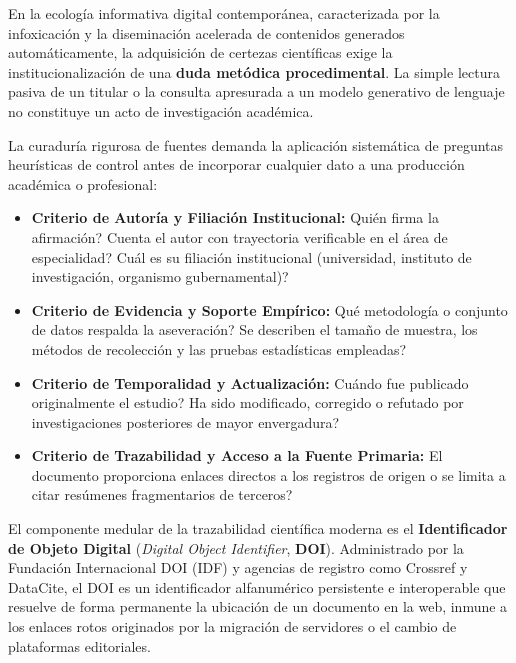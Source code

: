 En la ecología informativa digital contemporánea, caracterizada por la infoxicación y la diseminación acelerada de contenidos generados automáticamente, la adquisición de certezas científicas exige la institucionalización de una \textbf{duda metódica procedimental}. La simple lectura pasiva de un titular o la consulta apresurada a un modelo generativo de lenguaje no constituye un acto de investigación académica.

La curaduría rigurosa de fuentes demanda la aplicación sistemática de preguntas heurísticas de control antes de incorporar cualquier dato a una producción académica o profesional:
\begin{itemize}
    \item \textbf{Criterio de Autoría y Filiación Institucional:} \textquestiondown Quién firma la afirmación? \textquestiondown Cuenta el autor con trayectoria verificable en el área de especialidad? \textquestiondown Cuál es su filiación institucional (universidad, instituto de investigación, organismo gubernamental)?
    \item \textbf{Criterio de Evidencia y Soporte Empírico:} \textquestiondown Qué metodología o conjunto de datos respalda la aseveración? \textquestiondown Se describen el tamaño de muestra, los métodos de recolección y las pruebas estadísticas empleadas?
    \item \textbf{Criterio de Temporalidad y Actualización:} \textquestiondown Cuándo fue publicado originalmente el estudio? \textquestiondown Ha sido modificado, corregido o refutado por investigaciones posteriores de mayor envergadura?
    \item \textbf{Criterio de Trazabilidad y Acceso a la Fuente Primaria:} \textquestiondown El documento proporciona enlaces directos a los registros de origen o se limita a citar resúmenes fragmentarios de terceros?
\end{itemize}

El componente medular de la trazabilidad científica moderna es el \textbf{Identificador de Objeto Digital} (\textit{Digital Object Identifier}, \textbf{DOI}). Administrado por la Fundación Internacional DOI (IDF) y agencias de registro como Crossref y DataCite, el DOI es un identificador alfanumérico persistente e interoperable que resuelve de forma permanente la ubicación de un documento en la web, inmune a los enlaces rotos originados por la migración de servidores o el cambio de plataformas editoriales.

